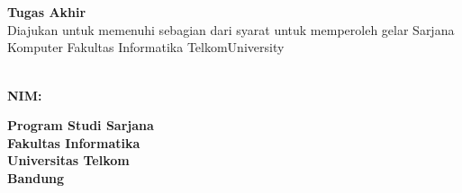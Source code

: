 {\centering
\large
{\bigsize\bf \Title}\\
\vspace{ 0.5cm}
{\bigsize\bf \textsl \EngTitle}\\
\vspace{ 1cm}
\rm
\textbf{Tugas Akhir}\\
\vspace{0.5 cm}
Diajukan untuk memenuhi sebagian dari syarat
untuk memperoleh gelar Sarjana Komputer
Fakultas Informatika
TelkomUniversity
\vspace{0.5 cm}

\vspace{0.5 cm}
\textbf{\Author}\\ \textbf{NIM: \NIM}\\ 

\vspace{1 cm}

\begin{figure}[h]
{\par}
\end{figure}

\vspace{1 cm}
{\bigsize\textbf{Program Studi Sarjana \Prodi}\\
\vspace{0.25 cm}
\textbf{Fakultas Informatika}\\
\vspace{0.5 cm}
\textbf{Universitas Telkom}\\
\vspace{0.5 cm}
\textbf{Bandung}\\
\vspace{0.5 cm}
\textbf{\Date}\\}
}